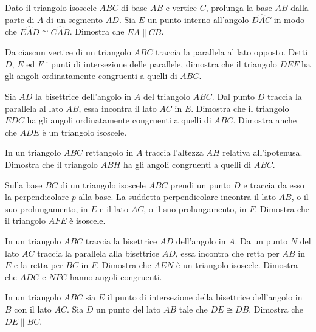 \begin{multicols}{2}
\begin{esercizio}
\label{ese:3.29}
Dato il triangolo isoscele $ABC$ di base $AB$ e vertice $C$, prolunga la base $AB$ dalla parte di $A$ di un segmento $AD$. Sia $E$ un punto interno all'angolo $D\widehat{A}C$ in modo che $E\widehat{A}D\cong C\widehat{A}B$. Dimostra che $EA\parallel CB$.
\end{esercizio}

\begin{esercizio}
\label{ese:3.30}
Da ciascun vertice di un triangolo $ABC$ traccia la parallela al lato opposto. Detti $D$, $E$ ed $F$ i punti di intersezione delle parallele, dimostra che il triangolo $DEF$ ha gli angoli ordinatamente congruenti a quelli di $ABC$.
\end{esercizio}

\begin{esercizio}
\label{ese:3.31}
Sia $AD$ la bisettrice dell'angolo in $A$ del triangolo $ABC$. Dal punto $D$ traccia la parallela al lato $AB$, essa incontra il lato $AC$ in $E$. Dimostra che il triangolo $EDC$ ha gli angoli ordinatamente congruenti a quelli di $ABC$. Dimostra anche che $ADE$ è un triangolo isoscele.
\end{esercizio}

\begin{esercizio}
\label{ese:3.32}
In un triangolo $ABC$ rettangolo in $A$ traccia l'altezza $AH$ relativa all'ipotenusa. Dimostra che il triangolo $ABH$ ha gli angoli congruenti a quelli di $ABC$.
\end{esercizio}

\begin{esercizio}
\label{ese:3.33}
Sulla base $BC$ di un triangolo isoscele $ABC$ prendi un punto $D$ e traccia da esso la perpendicolare $p$ alla base. La suddetta perpendicolare incontra il lato $AB$, o il suo prolungamento, in $E$ e il lato $AC$, o il suo prolungamento, in $F$. Dimostra che il triangolo $AFE$ è isoscele.
\end{esercizio}

\begin{esercizio}
\label{ese:3.34}
In un triangolo $ABC$ traccia la bisettrice $AD$ dell'angolo in $A$. Da un punto $N$ del lato $AC$ traccia la parallela alla bisettrice $AD$, essa incontra che retta per $AB$ in $E$ e la retta per $BC$ in $F$. Dimostra che $AEN$ è un triangolo isoscele. Dimostra che $ADC$ e $NFC$ hanno angoli congruenti.
\end{esercizio}

\begin{esercizio}
\label{ese:3.35}
In un triangolo $ABC$ sia $E$ il punto di intersezione della bisettrice dell'angolo in $B$ con il lato $AC$. Sia $D$ un punto del lato $AB$ tale che $DE\cong DB$. Dimostra che $DE\parallel BC$.
\end{esercizio}


\end{multicols}
